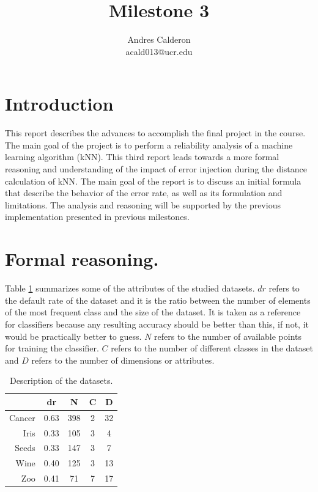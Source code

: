 \documentclass{article}
\title{Milestone 3}
\author{Andres Calderon \\ acald013@ucr.edu}
\begin{document}
\maketitle

\section{Introduction}
This report describes the advances to accomplish the final project in the course. The main goal of the project is to perform a reliability analysis of a machine learning algorithm (kNN).  This third report leads towards a more formal reasoning and understanding of the impact of error injection during the distance calculation of kNN.  The main goal of the report is to discuss an initial formula that describe the behavior of the error rate, as well as its formulation and limitations.  The analysis and reasoning will be supported by the previous implementation presented in previous milestones.

\section{Formal reasoning.}\label{sec:formal}
Table \ref{tab:desc} summarizes some of the attributes of the studied datasets. $dr$ refers to the default rate of the dataset and it is the ratio between the number of elements of the most frequent class and the size of the dataset.  It is taken as a reference for classifiers because any resulting accuracy should be better than this, if not, it would be practically better to guess. $N$ refers to the number of available points for training the classifier. $C$ refers to the number of different classes in the dataset and $D$ refers to the number of dimensions or attributes. 

\begin{table}
 \centering
 \begin{tabular}{rcccc}
  \toprule
	& \textbf{dr}	& \textbf{N}	& \textbf{C}	& \textbf{D} 	\\
  \midrule
Cancer	& 0.63	& 398	& 2	& 32 	\\
Iris	& 0.33	& 105	& 3	& 4 	\\
Seeds	& 0.33	& 147	& 3	& 7 	\\
Wine	& 0.40	& 125	& 3	& 13 	\\
Zoo	& 0.41	& 71	& 7	& 17 	\\
  \bottomrule
 \end{tabular}
 \caption{Description of the datasets.}\label{tab:desc}
\end{table}
\end{document}
